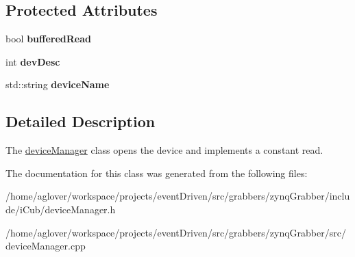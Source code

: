 \subsection*{Protected Attributes}
\begin{DoxyCompactItemize}
\item 
\hypertarget{classdeviceManager_af9556035e202ee95a17f2ecf5b7101db}{bool {\bfseries buffered\-Read}}\label{classdeviceManager_af9556035e202ee95a17f2ecf5b7101db}

\item 
\hypertarget{classdeviceManager_a1918c9e6863e6465e5d34ca86edcbfb7}{int {\bfseries dev\-Desc}}\label{classdeviceManager_a1918c9e6863e6465e5d34ca86edcbfb7}

\item 
\hypertarget{classdeviceManager_a6065df91f833483f38887ca5c1fea141}{std\-::string {\bfseries device\-Name}}\label{classdeviceManager_a6065df91f833483f38887ca5c1fea141}

\end{DoxyCompactItemize}


\subsection{Detailed Description}
The \hyperlink{classdeviceManager}{device\-Manager} class opens the device and implements a constant read. 

The documentation for this class was generated from the following files\-:\begin{DoxyCompactItemize}
\item 
/home/aglover/workspace/projects/event\-Driven/src/grabbers/zynq\-Grabber/include/i\-Cub/device\-Manager.\-h\item 
/home/aglover/workspace/projects/event\-Driven/src/grabbers/zynq\-Grabber/src/device\-Manager.\-cpp\end{DoxyCompactItemize}
